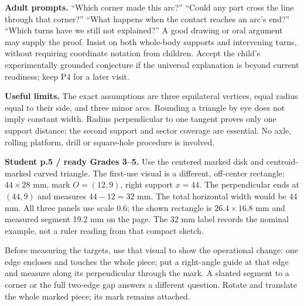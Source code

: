 \documentclass[11pt,letterpaper]{article}
\newcommand{\heading}[1]{\par\vspace{2pt}{\large\bfseries #1}\par}
\newcommand{\lead}[1]{\textbf{#1}}
\begin{document}
\lead{Adult prompts.} ``Which corner made this arc?'' ``Could any part cross the line through that corner?'' ``What happens when the contact reaches an arc's end?'' ``Which turns have we still not explained?'' A good drawing or oral argument may supply the proof. Insist on both whole-body supports and intervening turns, without requiring coordinate notation from children. Accept the child's experimentally grounded conjecture if the universal explanation is beyond current readiness; keep P4 for a later visit.

\lead{Useful limits.} The exact assumptions are three equilateral vertices, equal radius equal to their side, and three minor arcs. Rounding a triangle by eye does not imply constant width. Radius perpendicular to one tangent proves only one support distance; the second support and sector coverage are essential. No axle, rolling platform, drill or square-hole procedure is involved.

\newpage
\heading{A marked point and one support: Problem 5}
\lead{Student p.5 / ready Grades 3--5.} Use the centered marked disk and centroid-marked curved triangle. The first-use visual is a different, off-center rectangle: $44\times28$ mm, mark $O=(12,9)$, right support $x=44$. The perpendicular ends at $(44,9)$ and measures $44-12=32$ mm. The total horizontal width would be 44 mm. All three panels use scale 0.6; the shown rectangle is $26.4\times16.8$ mm and measured segment 19.2 mm on the page. The 32 mm label records the nominal example, not a ruler reading from that compact sketch.

Before measuring the targets, use that visual to show the operational change: one edge encloses and touches the whole piece; put a right-angle guide at that edge and measure along its perpendicular through the mark. A slanted segment to a corner or the full two-edge gap answers a different question. Rotate and translate the whole marked piece; its mark remains attached.
\end{document}
